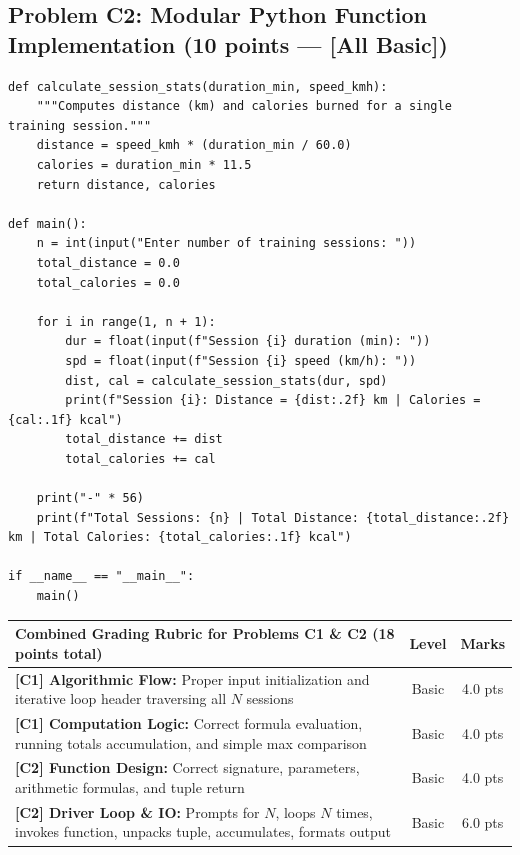 \documentclass[11pt,a4paper]{article}
\begin{document}
\vspace{0.2mm}
\subsection*{Problem C2: Modular Python Function Implementation (10 points --- [All Basic])}

\begin{lstlisting}
def calculate_session_stats(duration_min, speed_kmh):
    """Computes distance (km) and calories burned for a single training session."""
    distance = speed_kmh * (duration_min / 60.0)
    calories = duration_min * 11.5
    return distance, calories

def main():
    n = int(input("Enter number of training sessions: "))
    total_distance = 0.0
    total_calories = 0.0
    
    for i in range(1, n + 1):
        dur = float(input(f"Session {i} duration (min): "))
        spd = float(input(f"Session {i} speed (km/h): "))
        dist, cal = calculate_session_stats(dur, spd)
        print(f"Session {i}: Distance = {dist:.2f} km | Calories = {cal:.1f} kcal")
        total_distance += dist
        total_calories += cal
        
    print("-" * 56)
    print(f"Total Sessions: {n} | Total Distance: {total_distance:.2f} km | Total Calories: {total_calories:.1f} kcal")

if __name__ == "__main__":
    main()
\end{lstlisting}

\begin{center}
\renewcommand{\arraystretch}{1.06}
\setlength{\tabcolsep}{3.5pt}
\begin{tabularx}{\textwidth}{|X|c|c|}
\hline
\textbf{Combined Grading Rubric for Problems C1 \& C2 (18 points total)} & \textbf{Level} & \textbf{Marks} \\
\hline
\textbf{[C1] Algorithmic Flow:} Proper input initialization and iterative loop header traversing all $N$ sessions & Basic & 4.0 pts \\
\hline
\textbf{[C1] Computation Logic:} Correct formula evaluation, running totals accumulation, and simple max comparison & Basic & 4.0 pts \\
\hline
\hline
\textbf{[C2] Function Design:} Correct signature, parameters, arithmetic formulas, and tuple return & Basic & 4.0 pts \\
\hline
\textbf{[C2] Driver Loop \& IO:} Prompts for $N$, loops $N$ times, invokes function, unpacks tuple, accumulates, formats output & Basic & 6.0 pts \\
\hline
\end{tabularx}
\end{center}
\end{document}

